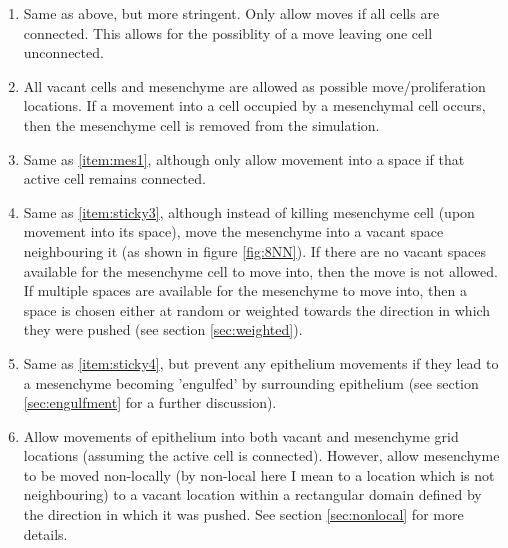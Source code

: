 \documentclass[pdftex,10pt,a4paper]{article}
\begin{document}
\begin{enumerate}
\begin{enumerate}
\item Same as above, but more stringent. Only allow moves if all cells are connected. This allows for the possiblity of a move leaving one cell unconnected.\label{item:sticky2}
\item All vacant cells and mesenchyme are allowed as possible move/proliferation locations. If a movement into a cell occupied by a mesenchymal cell occurs, then the mesenchyme cell is removed from the simulation.\label{item:mes1}
\item Same as \ref{item:mes1}, although only allow movement into a space if that active cell remains connected. \label{item:sticky3}
\item Same as \ref{item:sticky3}, although instead of killing mesenchyme cell (upon movement into its space), move the mesenchyme into a vacant space neighbouring it (as shown in figure \ref{fig:8NN}). If there are no vacant spaces available for the mesenchyme cell to move into, then the move is not allowed. If multiple spaces are available for the mesenchyme to move into, then a space is chosen either at random or weighted towards the direction in which they were pushed (see section \ref{sec:weighted}).\label{item:sticky4}
\item Same as \ref{item:sticky4}, but prevent any epithelium movements if they lead to a mesenchyme becoming 'engulfed' by surrounding epithelium (see section \ref{sec:engulfment} for a further discussion).\label{item:sticky5}
\item Allow movements of epithelium into both vacant and mesenchyme grid locations (assuming the active cell is connected). However, allow mesenchyme to be moved non-locally (by non-local here I mean to a location which is not neighbouring) to a vacant location within a rectangular domain defined by the direction in which it was pushed. See section \ref{sec:nonlocal} for more details.\label{item:sticky6}
\end{enumerate}
\end{enumerate}
\end{document}
